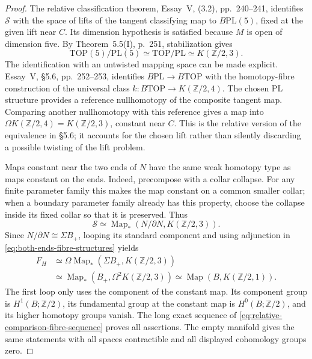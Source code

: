 \begin{proof}
The relative classification theorem, Essay~V, (3.2), pp.~240--241,
identifies $\mathcal S$ with the space of lifts of the tangent
classifying map to $B\mathrm{PL}(5)$, fixed at the given lift near
$C$.  Its dimension hypothesis is satisfied because $M$ is open of
dimension five.  By Theorem~5.5(I), p.~251, stabilization gives
\[
 \mathrm{TOP}(5)/\mathrm{PL}(5)\simeq
 \mathrm{TOP}/\mathrm{PL}\simeq K(\mathbb Z/2,3).
\]
The identification with an untwisted mapping space can be made
explicit.  Essay~V, \S5.6, pp.~252--253, identifies
$B\mathrm{PL}\to B\mathrm{TOP}$ with the homotopy-fibre construction
of the universal class
$k:B\mathrm{TOP}\to K(\mathbb Z/2,4)$.  The chosen PL structure
provides a reference nullhomotopy of the composite tangent map.
Comparing another nullhomotopy with this reference gives a map into
$\Omega K(\mathbb Z/2,4)=K(\mathbb Z/2,3)$, constant near $C$.
This is the relative version of the equivalence in \S5.6; it accounts
for the chosen lift rather than silently discarding a possible
twisting of the lift problem.

Maps constant near the two ends of $N$ have the same weak homotopy
type as maps constant on the ends.  Indeed, precompose with a collar
collapse.  For any finite parameter family this makes the map
constant on a common smaller collar; when a boundary parameter
family already has this property, choose the collapse inside its
fixed collar so that it is preserved.  Thus
\begin{equation}\label{eq:relative-pl-structure-mapping-space}
 \mathcal S\simeq
 \operatorname{Map}_*(N/\partial N,K(\mathbb Z/2,3)).
\end{equation}
Since $N/\partial N\cong\Sigma B_+$, looping its standard component
and using adjunction in \eqref{eq:both-ends-fibre-structures} yields
\[
\begin{aligned}
 F_H
 &\simeq\Omega\operatorname{Map}_*(\Sigma B_+,K(\mathbb Z/2,3))\\
 &\simeq\operatorname{Map}_*(B_+,\Omega^2K(\mathbb Z/2,3))
 \simeq\operatorname{Map}(B,K(\mathbb Z/2,1)).
\end{aligned}
\]
The first loop only uses the component of the constant map.
Its component group is $H^1(B;\mathbb Z/2)$, its fundamental group
at the constant map is $H^0(B;\mathbb Z/2)$, and its higher homotopy
groups vanish.  The long exact sequence of
\eqref{eq:relative-comparison-fibre-sequence} proves all assertions.
The empty manifold gives the same statements with all spaces
contractible and all displayed cohomology groups zero.
\end{proof}

